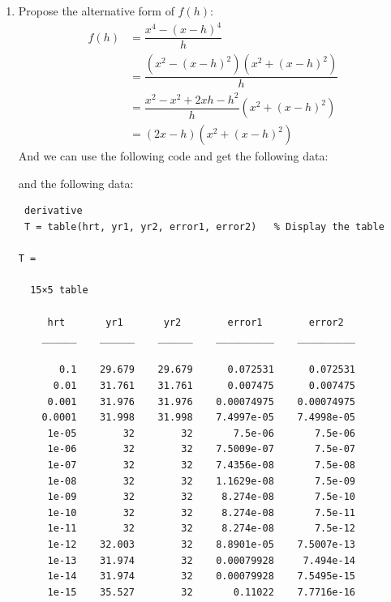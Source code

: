 \documentclass{article}
\begin{document}
\begin{enumerate}
And we can check with Matlab:\begin{lstlisting}
(4.9 - 3.9) -1

ans =

   4.4409e-16

ans - 2^(-51)

ans =

     0

diary off
\end{lstlisting}

\item
Propose the alternative form of $f(h)$:\begin{align*}
f(h) &= \dfrac{x^4 - (x-h)^4}{h}\\
&=\dfrac{(x^2-(x-h)^2)(x^2+(x-h)^2)}{h}\\
&=\dfrac{x^2-x^2+2xh-h^2}{h}(x^2+(x-h)^2)\\
&=(2x-h)(x^2+(x-h)^2)
\end{align*}
And we can use the following code and get the following data:
\pagebreak


and the following data:\begin{lstlisting}
 derivative
 T = table(hrt, yr1, yr2, error1, error2)   % Display the table

T =

  15×5 table

     hrt       yr1       yr2        error1        error2  
    ______    ______    ______    __________    __________

       0.1    29.679    29.679      0.072531      0.072531
      0.01    31.761    31.761      0.007475      0.007475
     0.001    31.976    31.976    0.00074975    0.00074975
    0.0001    31.998    31.998    7.4997e-05    7.4998e-05
     1e-05        32        32       7.5e-06       7.5e-06
     1e-06        32        32    7.5009e-07       7.5e-07
     1e-07        32        32    7.4356e-08       7.5e-08
     1e-08        32        32    1.1629e-08       7.5e-09
     1e-09        32        32     8.274e-08       7.5e-10
     1e-10        32        32     8.274e-08       7.5e-11
     1e-11        32        32     8.274e-08       7.5e-12
     1e-12    32.003        32    8.8901e-05    7.5007e-13
     1e-13    31.974        32    0.00079928     7.494e-14
     1e-14    31.974        32    0.00079928    7.5495e-15
     1e-15    35.527        32       0.11022    7.7716e-16

\end{lstlisting}


\end{enumerate}
\end{document}
